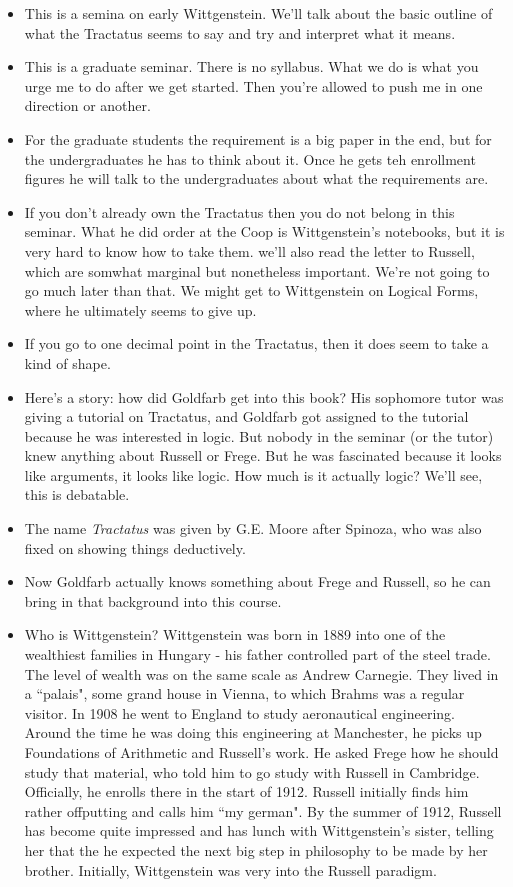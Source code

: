 \documentclass[12pt]{article}
\theoremstyle{definition}
\begin{document}
\begin{itemize}
    \itemsep0em 
    \item This is a semina on early Wittgenstein. We'll talk about the basic outline of what the Tractatus seems to say and try and interpret what it means.
    \item This is a graduate seminar. There is no syllabus. What we do is what you urge me to do after we get started. Then you're allowed to push me in one direction or another.
    \item For the graduate students the requirement is a big paper in the end, but for the undergraduates he has to think about it. Once he gets teh enrollment figures he will talk to the undergraduates about what the requirements are.
    \item If you don't already own the Tractatus then you do not belong in this seminar. What he did order at the Coop is Wittgenstein's notebooks, but it is very hard to know how to take them. we'll also read the letter to Russell, which are somwhat marginal but nonetheless important. We're not going to go much later than that. We might get to Wittgenstein on Logical Forms, where he ultimately seems to give up.
    \item If you go to one decimal point in the Tractatus, then it does seem to take a kind of shape. 
    \item Here's a story: how did Goldfarb get into this book? His sophomore tutor was giving a tutorial on Tractatus, and Goldfarb got assigned to the tutorial because he was interested in logic. But nobody in the seminar (or the tutor) knew anything about Russell or Frege. But he was fascinated because it looks like arguments, it looks like logic. How much is it actually logic? We'll see, this is debatable. 
    \item The name \textit{Tractatus} was given by G.E. Moore after Spinoza, who was also fixed on showing things deductively.
    \item Now Goldfarb actually knows something about Frege and Russell, so he can bring in that background into this course.
    \item Who is Wittgenstein? Wittgenstein was born in 1889 into one of the wealthiest families in Hungary - his father controlled part of the steel trade. The level of wealth was on the same scale as Andrew Carnegie. They lived in a ``palais", some grand house in Vienna, to which Brahms was a regular visitor. In 1908 he went to England to study aeronautical engineering. Around the time he was doing this engineering at Manchester, he picks up Foundations of Arithmetic and Russell's work. He asked Frege how he should study that material, who told him to go study with Russell in Cambridge. Officially, he enrolls there in the start of 1912. Russell initially finds him rather offputting and calls him ``my german". By the summer of 1912, Russell has become quite impressed and has lunch with Wittgenstein's sister, telling her that the he expected the next big step in philosophy to be made by her brother. Initially, Wittgenstein was very into the Russell paradigm.

\end{itemize}
\end{document}

